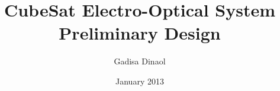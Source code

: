 \documentclass[a4paper,12pt]{book}
\begin{document}
\author{Gadisa Dinaol}
\title{CubeSat Electro-Optical System Preliminary Design}
\date{January 2013}

\frontmatter
\maketitle
\tableofcontents

\mainmatter








\backmatter
\end{document}
